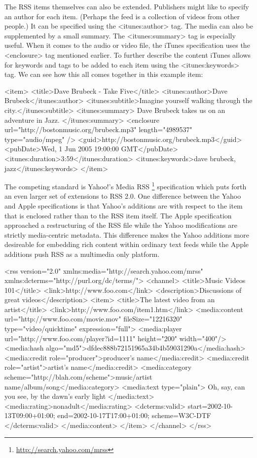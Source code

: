 \documentclass[a4paper,12pt]{report}
\begin{document}
The RSS items themselves can also be extended.
Publishers might like to specify an author for each item. (Perhaps the feed is a collection of videos from other people.)
It can be specified using the <itunes:author> tag.
The media can also be supplemented by a small summary.
The <itunes:summary> tag is especially useful.
When it comes to the audio or video file, the iTunes specification uses the <enclosure> tag mentioned earlier.
To further describe the content iTunes allows for keywords and tags to be added to each item using the <itunes:keywords> tag.
We can see how this all comes together in this example item:

	<item>
		<title>Dave Brubeck - Take Five</title>
		<itunes:author>Dave Brubeck</itunes:author>
		<itunes:subtitle>Imagine yourself walking through the city.</itunes:subtitle>
		<itunes:summary>
			Dave Brubeck takes us on an adventure in Jazz.
		</itunes:summary>
		<enclosure url="http://bostonmusic.org/brubeck.mp3" length="4989537" type="audio/mpeg" />
		<guid>http://bostonmusic.org/brubeck.mp3</guid>
		<pubDate>Wed, 1 Jun 2005 19:00:00 GMT</pubDate>
		<itunes:duration>3:59</itunes:duration>
		<itunes:keywords>dave brubeck, jazz</itunes:keywords>
	</item>

The competing standard is Yahoo!'s Media RSS \footnote{\url{http://search.yahoo.com/mrss}} specification which puts forth an even larger set of extensions to RSS 2.0.
One difference between the Yahoo and Apple specifications is that Yahoo's additions are with respect to the item that is enclosed rather than to the RSS item itself.
The Apple specification approached a restructuring of the RSS file while the Yahoo modifications are strictly media-centric metadata.
This difference makes the Yahoo additions more desireable for embedding rich content within ordinary text feeds while the Apple additions push RSS as a multimedia only platform.

<rss version="2.0" xmlns:media="http://search.yahoo.com/mrss"
xmlns:dcterms="http://purl.org/dc/terms/">
<channel>
<title>Music Videos 101</title>
<link>http://www.foo.com</link>
<description>Discussions of great videos</description>
	<item>
		<title>The latest video from an artist</title>
		<link>http://www.foo.com/item1.htm</link>
		<media:content url="http://www.foo.com/movie.mov" fileSize="12216320" 
		type="video/quicktime" expression="full">
		<media:player url="http://www.foo.com/player?id=1111" 
		height="200" width="400"/>
		<media:hash algo="md5">dfdec888b72151965a34b4b59031290a</media:hash>
		<media:credit role="producer">producer's name</media:credit>
		<media:credit role="artist">artist's name</media:credit>
		<media:category scheme="http://blah.com/scheme">music/artist 
		name/album/song</media:category>
		<media:text type="plain">
		Oh, say, can you see, by the dawn's early light
		</media:text>
		<media:rating>nonadult</media:rating>
		<dcterms:valid>
			start=2002-10-13T09:00+01:00;
			end=2002-10-17T17:00+01:00;
			scheme=W3C-DTF
		</dcterms:valid>
		</media:content>
	</item>
</channel>
</rss>
\end{document}
